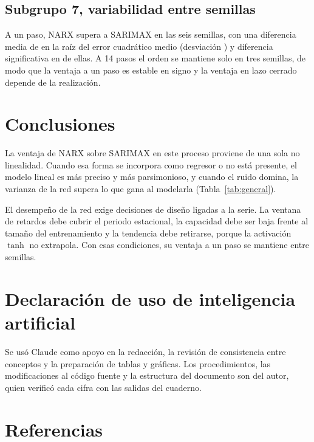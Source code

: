 \documentclass[11pt,letterpaper]{article}
\begin{document}
\subsection{Subgrupo 7, variabilidad entre semillas}

A un paso, NARX supera a SARIMAX en las seis semillas, con una diferencia media de \difSemMedia{} en la raíz del error cuadrático medio (desviación \difSemDesv) y diferencia significativa en \nSemSig{} de ellas. A 14 pasos el orden se mantiene solo en tres semillas, de modo que la ventaja a un paso es estable en signo y la ventaja en lazo cerrado depende de la realización.

\section{Conclusiones}

La ventaja de NARX sobre SARIMAX en este proceso proviene de una sola no linealidad. Cuando esa forma se incorpora como regresor o no está presente, el modelo lineal es más preciso y más parsimonioso, y cuando el ruido domina, la varianza de la red supera lo que gana al modelarla (Tabla~\ref{tab:general}).

El desempeño de la red exige decisiones de diseño ligadas a la serie. La ventana de retardos debe cubrir el periodo estacional, la capacidad debe ser baja frente al tamaño del entrenamiento y la tendencia debe retirarse, porque la activación $\tanh$ no extrapola. Con esas condiciones, su ventaja a un paso se mantiene entre semillas.

\section{Declaración de uso de inteligencia artificial}

Se usó Claude como apoyo en la redacción, la revisión de consistencia entre conceptos y la preparación de tablas y gráficas. Los procedimientos, las modificaciones al código fuente y la estructura del documento son del autor, quien verificó cada cifra con las salidas del cuaderno.

\section{Referencias}
\end{document}
